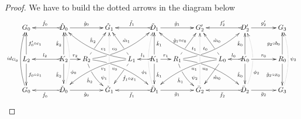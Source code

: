 \documentclass[a4paper,UKenglish,cleveref,pdftex,thm-restate,numberwithinsect]{lipics-v2021}
\newcommand{\id}[1]{\mathsf{id}_{#1}}
\def\G{\textbf {\textup{G}}}
\begin{document}
\begin{proof}
We have to build the dotted arrows in the diagram below
	\[\xymatrix@C=15pt@R=30pt{G_0 && \ar@{>->}[ll]_{\hat{f}_0} \hat{D}_0 \ar[rr]^{\hat{g}_0}&& \hat{G}_1  && \ar@{>->}[ll]_{\tilde{f}_1} \tilde{D}_1 \ar[rr]^{\tilde{g}_1}&& G'_2 && \ar@{>->}[ll]_{f'_2} D'_2 \ar[rr]^{g'_2}&& G_3 \\
		L_2\ar[d]^{f_0\circ z_1} \ar[u]_{f'_0\circ c_1}&& K_2 \ar[u]^{\hat{k}_2}\ar[d]_{\mathring{k}_2}\ar@{>->}[ll]_{l_2} \ar[r]^{r_2} & R_2 \ar@/_.35cm/[urrr]^(.4){e_0}|(.29)\hole \ar[ur]|(.28)\hole^{\hat{h}_2} \ar@/^.35cm/[drrr]_(.4){v_0}|(.29)\hole \ar@/_.2cm/[dr]|(.28)\hole_{\mathring{h}_2} && L_1 \ar@/^.35cm/[ulll]_(.4){e_1} \ar[ul]|(.28)\hole_{\hat{m}_1} \ar@/_.35cm/[dlll]^(.4){v_1} \ar[dl]|(.28)\hole^{\mathring{f}_1 \circ x_1}& K_1  \ar[u]_{\hat{k}_1}\ar[d]^{\mathring{k}_1}\ar@{>->}[l]_{l_1} \ar[r]^{r_1} & R_1 \ar@/^.35cm/[drrr]_(.4){u_0}|(.29)\hole\ar@/_.2cm/[dr]_{\check{h}_1}|(.28)\hole \ar@/_.35cm/[urrr]^(.4){t_0}|(.29)\hole \ar[ur]|(.28)\hole^{\hat{g}_1\circ c_0}  && L_0\ar[ul]|(.28)\hole_{\hat{m}_0} \ar@/^.35cm/[ulll]_(.4){t_1} \ar@/_.35cm/[dlll]^(.4){u_1} \ar[dl]^{\mathring{m}_0}& K_0 \ar[d]_{\mathring{k}_0}\ar[u]^{\hat{k}_0}\ar@{>->}[l]_{l_0} \ar[rr]^{r_0} && R_0 \ar[u]^{g_2\circ b_0}\ar[d]_{\check{g}_2\circ x_0} \\G_0 \ar@/^.3cm/[uu]^{\id{G_0}}&& \ar@{>->}[ll]^{\check{f}_0} \check{D}_0 \ar@{.>}@/_.3cm/[uu]_(.3){\phi_{0}}|\hole  \ar[rr]_{\check{g}_0}&& \check{G}_1  \ar@{.>}@/_.0cm/[uu]^(.2){\psi_{1}}|(.43)\hole |(.57)\hole  && \ar@{>->}[ll]^{\bar{f}_1} \bar{D}_1 \ar@{.>}@/^.3cm/[uu]^(.3){\phi_{1}}|\hole \ar[rr]_{\bar{g}_1}&& \bar{G}_2 \ar@{.>}@/_.0cm/[uu]^(.2){\psi_{2}}|(.43)\hole |(.57)\hole && \ar@{>->}[ll]^{\bar{f}_2} \ar@{.>}@/_.4cm/[uu]_(.3){\phi_{2}}|\hole \bar{D}_2 \ar[rr]_{\bar{g}_2}&& G_3 \ar@{.>}@/_.3cm/[uu]_{\psi_{3}} }\]
	

\end{proof}
\end{document}
